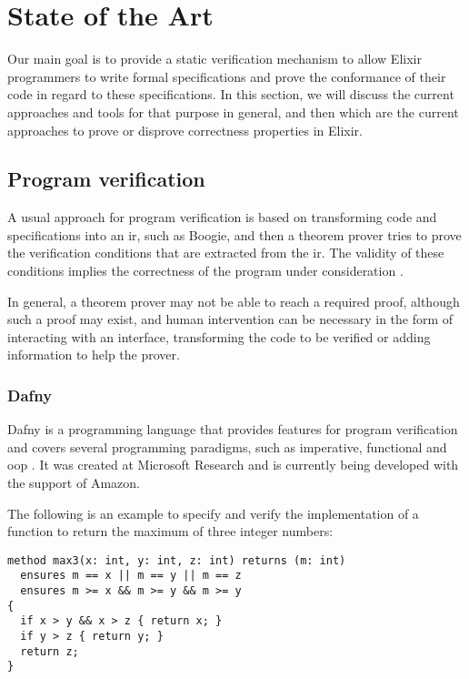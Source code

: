 \chapter{State of the Art}
\label{cap:stateOfTheArt}


Our main goal is to provide a static verification mechanism to allow Elixir
programmers to write formal specifications and prove the conformance of their 
code in regard to these specifications. In this section, we will discuss the
current approaches and tools for that purpose in general, and then which are the
current approaches to prove or disprove correctness properties in Elixir.

\section{Program verification}

A usual approach for program verification is based on transforming code and
specifications into an \gls{ir}, such as Boogie, and then a theorem prover tries
to prove the verification conditions that are extracted from the \gls{ir}. The
validity of these conditions implies the correctness of the program under
consideration \citep{Boogie2}.

In general, a theorem prover may not be able to reach a required proof, although
such a proof may exist, and human intervention can be necessary in the form of
interacting with an interface, transforming the code to be verified or adding
information to help the prover.

\subsection{Dafny}

Dafny is a programming language that provides features for program verification
and covers several programming paradigms, such as imperative, functional and
\gls{oop} \citep{DafnyManual}.  It was created at Microsoft Research and is
currently being developed with the support of Amazon.

The following is an example to specify and verify the implementation of a
function to return the maximum of three integer numbers:

\begin{verbatim}
method max3(x: int, y: int, z: int) returns (m: int)
  ensures m == x || m == y || m == z
  ensures m >= x && m >= y && m >= y
{
  if x > y && x > z { return x; }
  if y > z { return y; }
  return z;
}
\end{verbatim}

